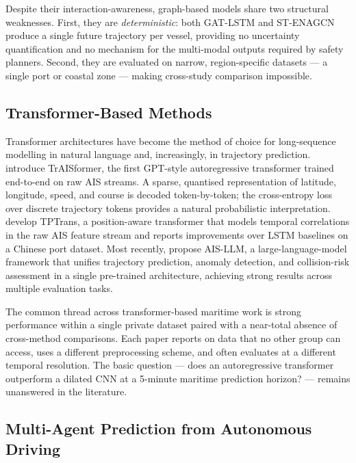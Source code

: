 \documentclass[12pt, a4paper]{article}
\begin{document}
  Despite their interaction-awareness, graph-based models share two structural
  weaknesses.  First, they are \emph{deterministic}: both GAT-LSTM and ST-ENAGCN
  produce a single future trajectory per vessel, providing no uncertainty
  quantification and no mechanism for the multi-modal outputs required by safety
  planners.  Second, they are evaluated on narrow, region-specific datasets --- a
  single port or coastal zone --- making cross-study comparison impossible.

  \subsection{Transformer-Based Methods}

  Transformer architectures have become the method of choice for long-sequence
  modelling in natural language and, increasingly, in trajectory prediction.
  \citet{nguyen2021traisformer} introduce TrAISformer, the first GPT-style
  autoregressive transformer trained end-to-end on raw AIS streams.  A sparse,
  quantised representation of latitude, longitude, speed, and course is decoded
  token-by-token; the cross-entropy loss over discrete trajectory tokens provides
  a natural probabilistic interpretation.  \citet{wang2024tptrans} develop
  TPTrans, a position-aware transformer that models temporal correlations in the
  raw AIS feature stream and reports improvements over LSTM baselines on a Chinese
  port dataset.  Most recently, \citet{park2025aisllm} propose AIS-LLM, a
  large-language-model framework that unifies trajectory prediction, anomaly
  detection, and collision-risk assessment in a single pre-trained architecture,
  achieving strong results across multiple evaluation tasks.

  The common thread across transformer-based maritime work is strong performance
  within a single private dataset paired with a near-total absence of
  cross-method comparisons.  Each paper reports on data that no other group can
  access, uses a different preprocessing scheme, and often evaluates at a
  different temporal resolution.  The basic question --- does an autoregressive
  transformer outperform a dilated CNN at a 5-minute maritime prediction horizon?
  --- remains unanswered in the literature.

  \subsection{Multi-Agent Prediction from Autonomous Driving}
\end{document}
